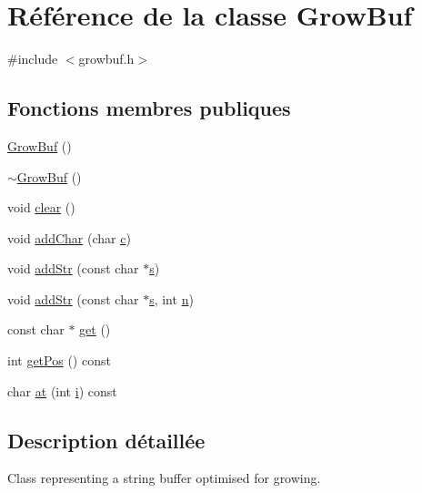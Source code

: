 \hypertarget{class_grow_buf}{}\section{Référence de la classe Grow\+Buf}
\label{class_grow_buf}


{\ttfamily \#include $<$growbuf.\+h$>$}

\subsection*{Fonctions membres publiques}
\begin{DoxyCompactItemize}
\item 
\hyperlink{class_grow_buf_a7868767b69ab7f10f3a36da73e2f5e5f}{Grow\+Buf} ()
\item 
\hyperlink{class_grow_buf_af7206ac4d12d20889037d545e6bab0d9}{$\sim$\+Grow\+Buf} ()
\item 
void \hyperlink{class_grow_buf_a7aadcbc3d02fe6e01acf45d892cff0ba}{clear} ()
\item 
void \hyperlink{class_grow_buf_a46b4677f555d2abc718f26e71a59efda}{add\+Char} (char \hyperlink{060__command__switch_8tcl_ab14f56bc3bd7680490ece4ad7815465f}{c})
\item 
void \hyperlink{class_grow_buf_ac2a971c747abdd4cb7cb038a3e27197b}{add\+Str} (const char $\ast$\hyperlink{060__command__switch_8tcl_a011c73f2dbb87635a3b4206c72355f6e}{s})
\item 
void \hyperlink{class_grow_buf_afac18a4ba578aaa629d2139694c619ae}{add\+Str} (const char $\ast$\hyperlink{060__command__switch_8tcl_a011c73f2dbb87635a3b4206c72355f6e}{s}, int \hyperlink{060__command__switch_8tcl_acdde3cd86eb2421ce8dbb2e85227d368}{n})
\item 
const char $\ast$ \hyperlink{class_grow_buf_ad3c02793a6af0024c063e67f1254803c}{get} ()
\item 
int \hyperlink{class_grow_buf_a05767584858b625daa8d1a4c9fe7e3c1}{get\+Pos} () const 
\item 
char \hyperlink{class_grow_buf_a2ec048f3feb2d273f3ce43abfa7e4d44}{at} (int \hyperlink{060__command__switch_8tcl_a8c90afd4641b25be86bd09983c3cbee0}{i}) const 
\end{DoxyCompactItemize}


\subsection{Description détaillée}
Class representing a string buffer optimised for growing. 

